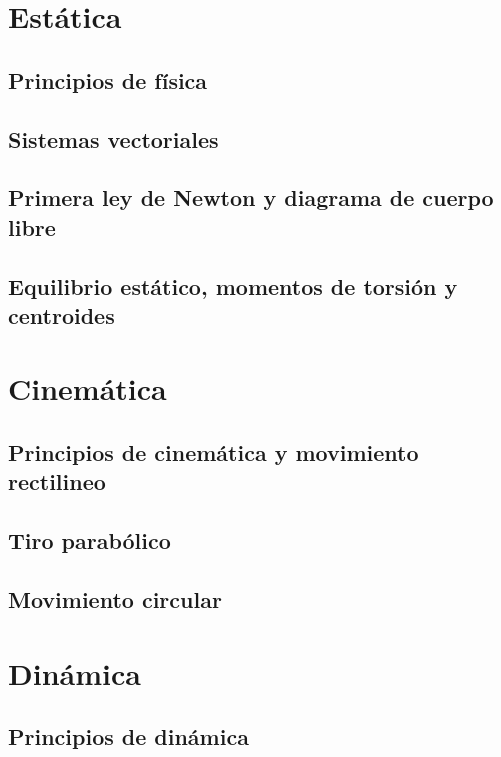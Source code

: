 \documentclass{AsignaturaResumen}
\begin{document}
    \frontmatter
    
\Portada    
\Indices

    \mainmatter
    

\part{Estática}

    \chapter{Principios de física} 
    \chapter{Sistemas vectoriales} 
    \chapter{Primera ley de Newton y diagrama de cuerpo libre} 
    \chapter{Equilibrio estático, momentos de torsión y centroides} 

\part{Cinemática}

    \chapter{Principios de cinemática y movimiento rectilineo} 
    \chapter{Tiro parabólico} 
    \chapter{Movimiento circular} 

\part{Dinámica}

    \chapter{Principios de dinámica} 
\end{document}
